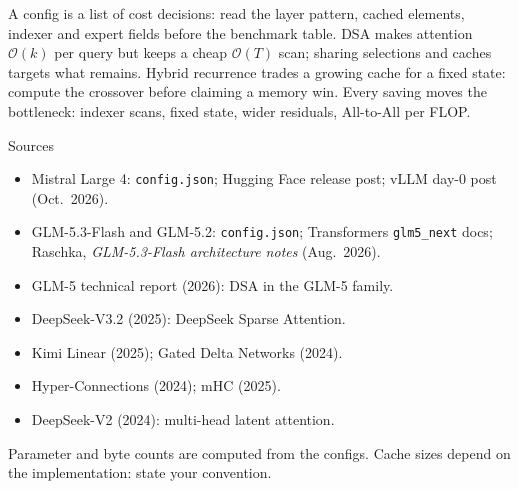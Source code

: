 \documentclass[handout]{beamer}
\begin{document}
\takeaways
{A config is a list of cost decisions: read the layer pattern, cached elements, indexer and expert fields before the benchmark table.}
{DSA makes attention $\mathcal{O}(k)$ per query but keeps a cheap $\mathcal{O}(T)$ scan; sharing selections and caches targets what remains.}
{Hybrid recurrence trades a growing cache for a fixed state: compute the crossover before claiming a memory win.}
{Every saving moves the bottleneck: indexer scans, fixed state, wider residuals, All-to-All per FLOP.}

\begin{frame}{Sources}
  \footnotesize
  \begin{itemize}
      \setlength{\itemsep}{3pt}
    \item Mistral Large 4: \texttt{config.json}; Hugging Face release post; vLLM day-0 post (Oct.\ 2026).
    \item GLM-5.3-Flash and GLM-5.2: \texttt{config.json}; Transformers \texttt{glm5\_next} docs; Raschka, \emph{GLM-5.3-Flash architecture notes} (Aug.\ 2026).
    \item GLM-5 technical report (2026): DSA in the GLM-5 family.
    \item DeepSeek-V3.2 (2025): DeepSeek Sparse Attention.
    \item Kimi Linear (2025); Gated Delta Networks (2024).
    \item Hyper-Connections (2024); mHC (2025).
    \item DeepSeek-V2 (2024): multi-head latent attention.
  \end{itemize}
  \vfill
  \small Parameter and byte counts are computed from the configs. Cache sizes depend on the implementation: state your convention.
\end{frame}
\end{document}
